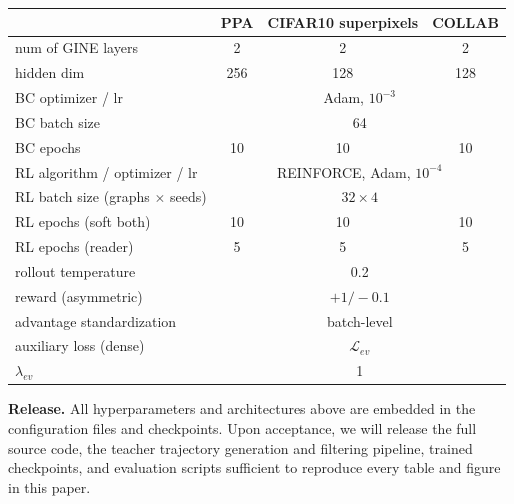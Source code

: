 \begin{center}
\small
\begin{tabular}{lccc}
\hline
 & PPA & CIFAR10 superpixels & COLLAB \\
\hline
num of GINE layers & 2 & 2 & 2 \\
hidden dim & 256 & 128 & 128 \\
BC optimizer / lr & \multicolumn{3}{c}{Adam, $10^{-3}$} \\
BC batch size & \multicolumn{3}{c}{64} \\
BC epochs & 10 & 10 & 10 \\
RL algorithm / optimizer / lr & \multicolumn{3}{c}{REINFORCE, Adam, $10^{-4}$} \\
RL batch size (graphs $\times$ seeds) & \multicolumn{3}{c}{$32 \times 4$} \\
RL epochs (soft both) & 10 & 10 & 10 \\
RL epochs (reader) & 5 & 5 & 5 \\
rollout temperature & \multicolumn{3}{c}{0.2} \\
reward (asymmetric) & \multicolumn{3}{c}{$+1/-0.1$} \\
advantage standardization & \multicolumn{3}{c}{batch-level} \\
auxiliary loss (dense) & \multicolumn{3}{c}{$\mathcal{L}_{ev}$} \\
$\lambda_{ev}$ & \multicolumn{3}{c}{1} \\
\hline
\end{tabular}
\end{center}

\textbf{Release.} All hyperparameters and architectures above are embedded in the configuration files and checkpoints. Upon acceptance, we will release the full source code, the teacher trajectory generation and filtering pipeline, trained checkpoints, and evaluation scripts sufficient to reproduce every table and figure in this paper.
